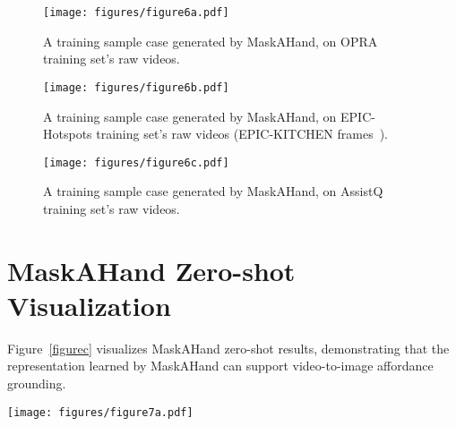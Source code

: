 \documentclass[10pt,twocolumn,letterpaper]{article}
\begin{document}
\begin{figure*}[t]
    \centering
    \begin{subfigure}{\linewidth}
        \centering
        \texttt{[image: figures/figure6a.pdf]}
        \caption{A training sample case generated by MaskAHand, on OPRA training set's raw videos.}
    \end{subfigure}
    \begin{subfigure}{\linewidth}
        \centering
        \texttt{[image: figures/figure6b.pdf]}
        \caption{A training sample case generated by MaskAHand, on EPIC-Hotspots training set's raw videos (\ie EPIC-KITCHEN frames~\cite{epic-kitchens-55}).}
    \end{subfigure}
    \begin{subfigure}{\linewidth}
        \centering
        \texttt{[image: figures/figure6c.pdf]}
        \caption{A training sample case generated by MaskAHand, on AssistQ training set's raw videos.}
    \end{subfigure}
    \caption{MaskAHand generated training sample cases on OPRA~\cite{demo2vec}, EPIC-Hotspots~\cite{hotspot}, and AssistQ~\cite{assistq}. The hand interaction detection is made by our trained hand interaction R-CNN, mentioned in Section 4.2. ``WithObj'' means the hand is interacting with objects, whereas ``NoObj'' means not interacting. The mined video clip contains 32 frames (with 5 FPS). If there are multiple interaction frames detected (\eg, (a) and (c)), the target image generation will be randomly picked from these frames.}\label{figureb}
\end{figure*}


\section{MaskAHand Zero-shot Visualization}\label{sectione}

Figure~\ref{figurec} visualizes MaskAHand zero-shot results, demonstrating that the representation learned by MaskAHand can support video-to-image affordance grounding.

\begin{figure*}[t]
    \centering
    \texttt{[image: figures/figure7a.pdf]}
    \caption{MaskAHand zero-shot results on OPRA test set. For visualization, we select the top 100 points on the ground-truth and zero-shot prediction heatmap. It can be seen that the hotspot on the zero-shot heatmap is close to that on the ground-truth heatmap.}\label{figurec}
\end{figure*}
\end{document}
